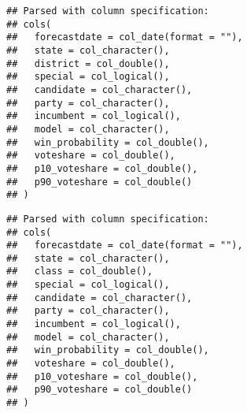 \documentclass[]{article}
\newenvironment{Shaded}{\begin{snugshade}}{\end{snugshade}}
\newcommand{\CommentTok}[1]{\textcolor[rgb]{0.56,0.35,0.01}{\textit{#1}}}
\newcommand{\DataTypeTok}[1]{\textcolor[rgb]{0.13,0.29,0.53}{#1}}
\newcommand{\KeywordTok}[1]{\textcolor[rgb]{0.13,0.29,0.53}{\textbf{#1}}}
\newcommand{\NormalTok}[1]{#1}
\newcommand{\OperatorTok}[1]{\textcolor[rgb]{0.81,0.36,0.00}{\textbf{#1}}}
\newcommand{\StringTok}[1]{\textcolor[rgb]{0.31,0.60,0.02}{#1}}
\begin{document}
\begin{verbatim}
## Parsed with column specification:
## cols(
##   forecastdate = col_date(format = ""),
##   state = col_character(),
##   district = col_double(),
##   special = col_logical(),
##   candidate = col_character(),
##   party = col_character(),
##   incumbent = col_logical(),
##   model = col_character(),
##   win_probability = col_double(),
##   voteshare = col_double(),
##   p10_voteshare = col_double(),
##   p90_voteshare = col_double()
## )
\end{verbatim}

\begin{Shaded}
\end{Shaded}

\begin{verbatim}
## Parsed with column specification:
## cols(
##   forecastdate = col_date(format = ""),
##   state = col_character(),
##   class = col_double(),
##   special = col_logical(),
##   candidate = col_character(),
##   party = col_character(),
##   incumbent = col_logical(),
##   model = col_character(),
##   win_probability = col_double(),
##   voteshare = col_double(),
##   p10_voteshare = col_double(),
##   p90_voteshare = col_double()
## )
\end{verbatim}
\end{document}
